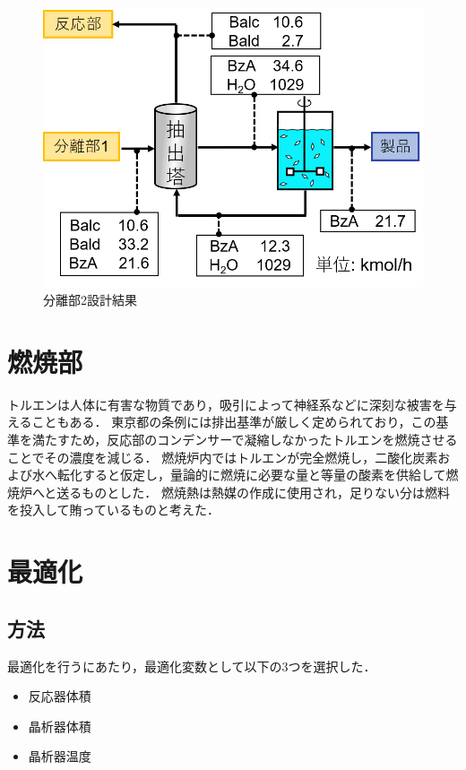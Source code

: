 \documentclass[a4j]{jsreport}
\begin{document}
\begin{figure}[htbp]
  \centering
  \includegraphics[scale=0.7]{Separion2Conclusion.png}
  \caption{分離部2設計結果}
  \label{分離部2設計結果}
\end{figure}


\clearpage
\chapter{燃焼部}
トルエンは人体に有害な物質であり，吸引によって神経系などに深刻な被害を与えることもある．
東京都の条例には排出基準が厳しく定められており，この基準を満たすため，反応部のコンデンサーで凝縮しなかったトルエンを燃焼させることでその濃度を減じる．
燃焼炉内ではトルエンが完全燃焼し，二酸化炭素および水へ転化すると仮定し，量論的に燃焼に必要な量と等量の酸素を供給して燃焼炉へと送るものとした．
燃焼熱は熱媒の作成に使用され，足りない分は燃料を投入して賄っているものと考えた．

\clearpage
\chapter{最適化}
\section{方法}
最適化を行うにあたり，最適化変数として以下の3つを選択した．
\begin{itemize}
  \item 反応器体積
  \item 晶析器体積
  \item 晶析器温度
\end{itemize}
\end{document}
